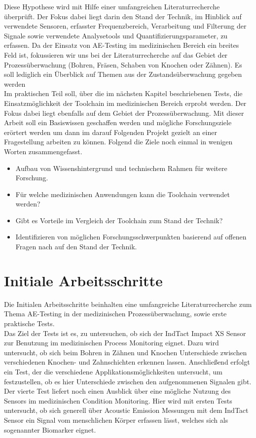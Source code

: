 \documentclass[twoside, 12pt, a4paper]{article}
\begin{document}
	Diese Hypothese wird mit Hilfe einer umfangreichen Literaturrecherche \"uberpr\"uft. Der Fokus dabei liegt darin den Stand der Technik, im Hinblick auf verwendete Sensoren, erfasster Frequenzbereich, Verarbeitung und Filterung der Signale sowie verwendete Analysetools und Quantifizierungsparameter, zu erfassen. Da der Einsatz von AE-Testing im medizinischen Bereich ein breites Feld ist, fokussieren wir uns bei der Literaturrecherche auf das Gebiet der Prozess\"uberwachung (Bohren, Fr\"asen, Schaben von Knochen oder Z\"ahnen). Es soll lediglich ein \"Uberblick auf Themen aus der Zustands\"uberwachung gegeben werden \\    
	Im praktischen Teil soll, \"uber die im n\"achsten Kapitel beschriebenen Tests, die Einsatzm\"oglichkeit der Toolchain im medizinischen Bereich erprobt werden. Der Fokus dabei liegt ebenfalls auf dem Gebiet der Prozess\"uberwachung. 
	Mit dieser Arbeit soll ein Basiswissen geschaffen werden und m\"ogliche Forschungsziele er\"ortert werden um dann im darauf Folgenden Projekt gezielt an einer Fragestellung arbeiten zu k\"onnen. Folgend die Ziele noch einmal in wenigen Worten zusammengefasst.
	
	\begin{itemize}
		\item {Aufbau von Wissenshintergrund und technischem Rahmen f\"ur	weitere Forschung.}
		\item {F\"ur welche medizinischen Anwendungen kann die Toolchain verwendet werden?} 
		\item {Gibt es Vorteile im Vergleich der Toolchain zum Stand der Technik?} 
		\item {Identifizieren von m\"oglichen Forschungsschwerpunkten basierend auf offenen Fragen nach auf den Stand der Technik.}
	\end{itemize} 
	
	 
	
	
	
	\section{Initiale Arbeitsschritte}
	
Die Initialen Arbeitsschritte beinhalten eine umfangreiche Literaturrecherche zum Thema AE-Testing in der medizinischen Prozess\"uberwachung, sowie erste praktische Tests. \\


Das Ziel der Tests ist es, zu untersuchen, ob sich der IndTact Impact XS Sensor zur Benutzung im medizinischen Process Monitoring eignet. Dazu wird untersucht, ob sich beim Bohren in Z\"ahnen und Knochen Unterschiede zwischen verschiedenen Knochen- und Zahnschichten erkennen lassen. Anschlie{\ss}end erfolgt ein Test, der die verschiedene Applikationsm\"oglichkeiten untersucht, um festzustellen, ob es hier Unterschiede zwischen den aufgenommenen Signalen gibt. Der vierte Test liefert noch einen Ausblick \"uber eine m\"ogliche Nutzung des Sensors im medizinischen Condition Monitoring. Hier wird mit ersten Tests untersucht, ob sich generell \"uber Acoustic Emission Messungen mit dem IndTact Sensor ein Signal vom menschlichen K\"orper erfassen l\"asst, welches sich als sogenannter Biomarker eignet.  
\end{document}
